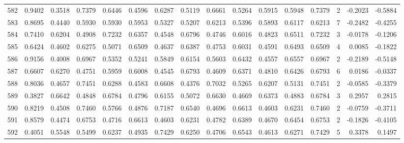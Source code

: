 \begin{tabular}{lrrrrrrrrrrrrrrr}
582 &      0.9402 &  0.3518 &  0.7379 &  0.6446 &  0.4596 &  0.6287 &  0.5119 &  0.6661 &  0.5264 &  0.5915 &   0.5948 &     0.7379 &      2 &                   -0.2023 &                    -0.5884 \\
583 &      0.8695 &  0.4440 &  0.5930 &  0.5930 &  0.5953 &  0.5327 &  0.5207 &  0.6213 &  0.5396 &  0.5893 &   0.6117 &     0.6213 &      7 &                   -0.2482 &                    -0.4255 \\
584 &      0.7410 &  0.6204 &  0.4908 &  0.7232 &  0.6357 &  0.4548 &  0.6796 &  0.4746 &  0.6016 &  0.4823 &   0.6511 &     0.7232 &      3 &                   -0.0178 &                    -0.1206 \\
585 &      0.6424 &  0.4602 &  0.6275 &  0.5071 &  0.6509 &  0.4637 &  0.6387 &  0.4753 &  0.6031 &  0.4591 &   0.6493 &     0.6509 &      4 &                    0.0085 &                    -0.1822 \\
586 &      0.9156 &  0.4008 &  0.6967 &  0.5352 &  0.5241 &  0.5849 &  0.6154 &  0.5603 &  0.6432 &  0.4557 &   0.6557 &     0.6967 &      2 &                   -0.2189 &                    -0.5148 \\
587 &      0.6607 &  0.6270 &  0.4751 &  0.5959 &  0.6008 &  0.4545 &  0.6793 &  0.4609 &  0.6371 &  0.4810 &   0.6426 &     0.6793 &      6 &                    0.0186 &                    -0.0337 \\
588 &      0.8036 &  0.4657 &  0.7451 &  0.6288 &  0.4583 &  0.6608 &  0.4376 &  0.7032 &  0.5265 &  0.6207 &   0.5131 &     0.7451 &      2 &                   -0.0585 &                    -0.3379 \\
589 &      0.3827 &  0.6642 &  0.4848 &  0.6784 &  0.4796 &  0.6155 &  0.5072 &  0.6630 &  0.4669 &  0.6373 &   0.4883 &     0.6784 &      3 &                    0.2957 &                     0.2815 \\
590 &      0.8219 &  0.4508 &  0.7460 &  0.5766 &  0.4876 &  0.7187 &  0.6540 &  0.4696 &  0.6613 &  0.4603 &   0.6231 &     0.7460 &      2 &                   -0.0759 &                    -0.3711 \\
591 &      0.8579 &  0.4474 &  0.6753 &  0.4716 &  0.6613 &  0.4603 &  0.6231 &  0.4782 &  0.6389 &  0.4670 &   0.6454 &     0.6753 &      2 &                   -0.1826 &                    -0.4105 \\
592 &      0.4051 &  0.5548 &  0.5499 &  0.6237 &  0.4935 &  0.7429 &  0.6250 &  0.4706 &  0.6543 &  0.4613 &   0.6271 &     0.7429 &      5 &                    0.3378 &                     0.1497 \\

\end{tabular}
